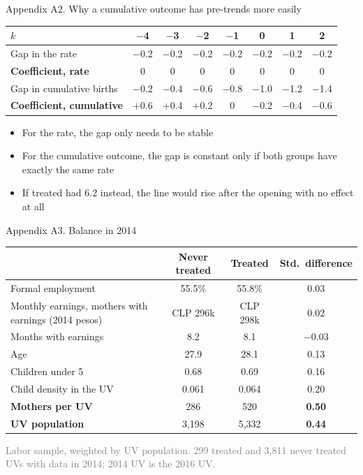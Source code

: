 \documentclass[aspectratio=169,10pt]{beamer}
\newcommand{\fuente}[1]{\vspace{2pt}\textcolor{graytext}{\scriptsize #1}}
\newcommand{\takeaway}[1]{\par\vspace{6pt}{\small\textcolor{steel}{$\Rightarrow$}\ \textbf{\textcolor{navy}{#1}}}}
\begin{document}
\begin{frame}{Appendix A2. Why a cumulative outcome has pre-trends more easily}
\vspace{4pt}
\begin{center}
\footnotesize
\begin{tabular}{@{}lccccccc@{}}
\toprule
$k$ & $-$4 & $-$3 & $-$2 & $-$1 & 0 & 1 & 2 \\
\midrule
Gap in the rate & $-$0.2 & $-$0.2 & $-$0.2 & $-$0.2 & $-$0.2 & $-$0.2 & $-$0.2 \\
\textbf{Coefficient, rate} & 0 & 0 & 0 & 0 & 0 & 0 & 0 \\
\midrule
Gap in cumulative births & $-$0.2 & $-$0.4 & $-$0.6 & $-$0.8 & $-$1.0 & $-$1.2 & $-$1.4 \\
\textbf{Coefficient, cumulative} & +0.6 & +0.4 & +0.2 & 0 & $-$0.2 & $-$0.4 & $-$0.6 \\
\bottomrule
\end{tabular}
\end{center}
\begin{itemize}
  \footnotesize
  \item For the rate, the gap only needs to be stable
  \item For the cumulative outcome, the gap is constant only if both groups have exactly the same rate
  \item If treated had 6.2 instead, the line would rise after the opening with no effect at all
\end{itemize}
\takeaway{A small stable gap in birth rates looks like a pre-trend, or an effect, in cumulative births.}
\end{frame}

\begin{frame}{Appendix A3. Balance in 2014}
\begin{center}
\footnotesize
\begin{tabular}{@{}lccc@{}}
\toprule
 & Never treated & Treated & Std.\ difference \\
\midrule
Formal employment & 55.5\% & 55.8\% & 0.03 \\
Monthly earnings, mothers with earnings (2014 pesos) & CLP 296k & CLP 298k & 0.02 \\
Months with earnings & 8.2 & 8.1 & $-$0.03 \\
Age & 27.9 & 28.1 & 0.13 \\
Children under 5 & 0.68 & 0.69 & 0.16 \\
Child density in the UV & 0.061 & 0.064 & 0.20 \\
\textbf{Mothers per UV} & 286 & 520 & \textbf{0.50} \\
\textbf{UV population} & 3,198 & 5,332 & \textbf{0.44} \\
\bottomrule
\end{tabular}
\end{center}
\par\fuente{Labor sample, weighted by UV population. 299 treated and 3,811 never treated UVs with data in 2014; 2014 UV is the 2016 UV.}
\takeaway{Mothers look alike in 2014; what differs is UV size.}
\end{frame}
\end{document}
